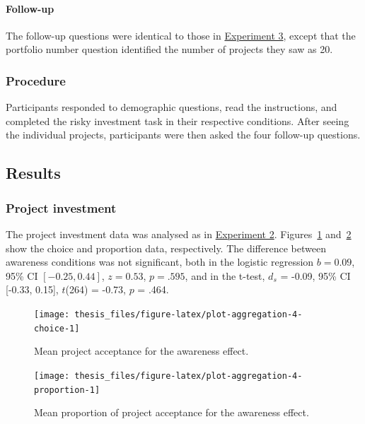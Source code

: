 \documentclass[a4paper, nobind, dvipsnames]{templates/ociamthesis}
\theoremstyle{definition}
\theoremstyle{definition}
\theoremstyle{definition}
\theoremstyle{definition}
\theoremstyle{remark}
\begin{document}
\hypertarget{follow-up-3}{%
\paragraph{Follow-up}\label{follow-up-3}}

The follow-up questions were identical to those in
\protect\hyperlink{follow-up-aggregation-3}{Experiment 3}, except that the portfolio number
question identified the number of projects they saw as 20.

\hypertarget{procedure-7}{%
\subsubsection{Procedure}\label{procedure-7}}

Participants responded to demographic questions, read the instructions, and
completed the risky investment task in their respective conditions. After seeing
the individual projects, participants were then asked the four follow-up
questions.

\hypertarget{results-5}{%
\subsection{Results}\label{results-5}}

\hypertarget{project-investment-2}{%
\subsubsection{Project investment}\label{project-investment-2}}

The project investment data was analysed as in
\protect\hyperlink{results-aggregation-2}{Experiment 2}.
Figures~\ref{fig:plot-aggregation-4-choice}
and~\ref{fig:plot-aggregation-4-proportion} show the choice and proportion
data, respectively. The difference between
awareness conditions was not significant, both in the logistic regression
\(b = 0.09\), 95\% CI \([-0.25, 0.44]\), \(z = 0.53\), \(p = .595\), and in the t-test,
\(d_s\) = -0.09, 95\% CI {[}-0.33, 0.15{]}, \(t\)(264) = -0.73, \(p\) = .464.



\begin{figure}
\texttt{[image: thesis\_files/figure-latex/plot-aggregation-4-choice-1]} \caption{Mean project acceptance for the awareness effect.}\label{fig:plot-aggregation-4-choice}
\end{figure}



\begin{figure}
\texttt{[image: thesis\_files/figure-latex/plot-aggregation-4-proportion-1]} \caption{Mean proportion of project acceptance for the awareness effect.}\label{fig:plot-aggregation-4-proportion}
\end{figure}
\end{document}
